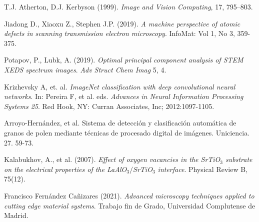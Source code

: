 \begin{thebibliography}{9}
T.J. Atherton, D.J. Kerbyson (1999). \textit{Image and Vision Computing}, 17, 795–803.

Jiadong D., Xiaoxu Z., Stephen J.P. (2019). \textit{A machine perspective of atomic defects in scanning transmission electron microscopy}. InfoMat: Vol 1, No 3, 359-375.

Potapov, P., Lubk, A. (2019). \textit{Optimal principal component analysis of STEM XEDS spectrum images}. \textit{Adv Struct Chem Imag} 5, 4. 

Krizhevsky A, et. al. \textit{ImageNet classification
with deep convolutional neural networks}. In: Pereira F, et al. eds. \textit{Advances in Neural
Information Processing Systems 25}. Red Hook, NY: Curran
Associates, Inc; 2012:1097-1105.

Arroyo-Hernández, et al. Sistema de detección y clasificación automática de granos de polen mediante técnicas de procesado digital de imágenes. Uniciencia. 27. 59-73. 

Kalabukhov, A., et al. (2007). \textit{Effect of oxygen vacancies in the SrTiO$_3$ substrate on the electrical properties of the LaAlO$_3/$SrTiO$_3$ interface}. Physical Review B, 75(12).

Francisco Fernández Cañizares (2021). \textit{Advanced microscopy techniques applied to cutting edge material systems}. Trabajo fin de Grado, Universidad Complutense de Madrid.

\end{thebibliography}


